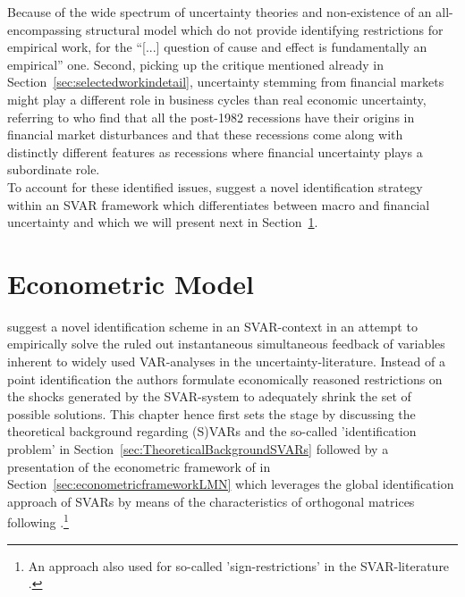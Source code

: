 \documentclass[a4paper,11pt,listof=nochaptergap,oneside,pointednumbers,bibtotoc,bigheadings,liststotoc,hidelinks]{scrbook}
\theoremstyle{mysatz}
\theoremstyle{mydefinition}
\theoremstyle{mytheorem}
\theoremstyle{mybemerkung}
\begin{document}
Because of the wide spectrum of uncertainty theories and non-existence of an all-encompassing structural model which do not provide identifying restrictions for empirical work, for \citet[p. 5]{ludvigsonetal:19} the ``[...] question of cause and effect is fundamentally an empirical'' one. Second, picking up the critique mentioned already in Section~\ref{sec:selectedworkindetail}, uncertainty stemming from financial markets might play a different role in business cycles than real economic uncertainty, referring to \citet{ngandwright:13} who find that all the post-1982 recessions have their origins in financial market disturbances and that these recessions come along with distinctly different features as recessions where financial uncertainty plays a subordinate role.\\

To account for these identified issues, \citet{ludvigsonetal:19} suggest a novel identification strategy within an SVAR framework which differentiates between macro and financial uncertainty and which we will present next in Section~\ref{EconometricModel}.




\chapter{Econometric Model}
\label{EconometricModel}
\citet{ludvigsonetal:18,ludvigsonetal:19} suggest a novel identification scheme in an SVAR-context in an attempt to empirically solve the ruled out instantaneous simultaneous feedback of variables inherent to widely used VAR-analyses in the uncertainty-literature. Instead of a point identification the authors formulate economically reasoned restrictions on the shocks generated by the SVAR-system to adequately shrink the set of possible solutions. This chapter hence first sets the stage by discussing the theoretical background regarding (S)VARs and the so-called 'identification problem' in Section~\ref{sec:TheoreticalBackgroundSVARs} followed by a presentation of the econometric framework of \citet{ludvigsonetal:19} in Section~\ref{sec:econometricframeworkLMN} which leverages the global identification approach of SVARs by means of the characteristics of orthogonal matrices following \citet{rubioetal:10}.\footnote{An approach also used for so-called 'sign-restrictions' in the SVAR-literature \citep{lutkepohlkilian:17}.}
\end{document}
